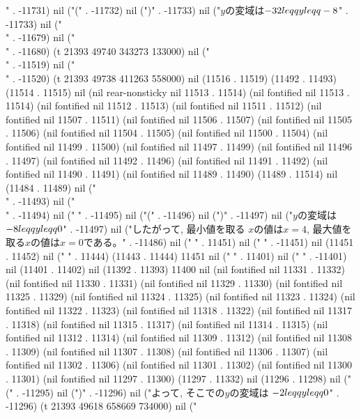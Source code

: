 " . -11731) nil ("(" . -11732) nil (")" . -11733) nil ("$y$の変域は$-32\\leqq y\\leqq -8$" . -11733) nil ("\\" . -11679) nil ("\\" . -11680) (t 21393 49740 343273 133000) nil ("\\" . -11519) nil ("\\" . -11520) (t 21393 49738 411263 558000) nil (11516 . 11519) (11492 . 11493) (11514 . 11515) nil (nil rear-nonsticky nil 11513 . 11514) (nil fontified nil 11513 . 11514) (nil fontified nil 11512 . 11513) (nil fontified nil 11511 . 11512) (nil fontified nil 11507 . 11511) (nil fontified nil 11506 . 11507) (nil fontified nil 11505 . 11506) (nil fontified nil 11504 . 11505) (nil fontified nil 11500 . 11504) (nil fontified nil 11499 . 11500) (nil fontified nil 11497 . 11499) (nil fontified nil 11496 . 11497) (nil fontified nil 11492 . 11496) (nil fontified nil 11491 . 11492) (nil fontified nil 11490 . 11491) (nil fontified nil 11489 . 11490) (11489 . 11514) nil (11484 . 11489) nil ("\\" . -11493) nil ("\\" . -11494) nil ("
" . -11495) nil ("(" . -11496) nil (")" . -11497) nil ("$y$の変域は$-8\\leqq y\\leqq 0$" . -11497) nil ("したがって, 最小値を取る
$x$の値は$x=4$, 最大値を取る$x$の値は$x=0$である。" . -11486) nil ("
" . 11451) nil ("
" . -11451) nil (11451 . 11452) nil (" " . 11444) (11443 . 11444) 11451 nil ("
" . 11401) nil ("
" . -11401) nil (11401 . 11402) nil (11392 . 11393) 11400 nil (nil fontified nil 11331 . 11332) (nil fontified nil 11330 . 11331) (nil fontified nil 11329 . 11330) (nil fontified nil 11325 . 11329) (nil fontified nil 11324 . 11325) (nil fontified nil 11323 . 11324) (nil fontified nil 11322 . 11323) (nil fontified nil 11318 . 11322) (nil fontified nil 11317 . 11318) (nil fontified nil 11315 . 11317) (nil fontified nil 11314 . 11315) (nil fontified nil 11312 . 11314) (nil fontified nil 11309 . 11312) (nil fontified nil 11308 . 11309) (nil fontified nil 11307 . 11308) (nil fontified nil 11306 . 11307) (nil fontified nil 11302 . 11306) (nil fontified nil 11301 . 11302) (nil fontified nil 11300 . 11301) (nil fontified nil 11297 . 11300) (11297 . 11332) nil (11296 . 11298) nil ("(" . -11295) nil (")" . -11296) nil ("よって, そこでの$y$の変域は
$-2\\leqq y\\leqq 0$" . -11296) (t 21393 49618 658669 734000) nil ("
